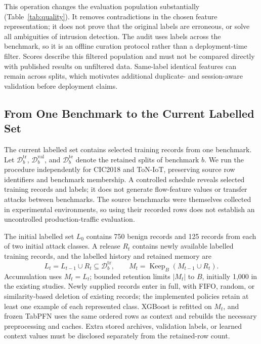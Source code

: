 \documentclass[sigconf,anonymous,pbalance]{acmart}
\begin{document}
This operation changes the evaluation population substantially (Table~\ref{tab:quality}). It removes contradictions in the chosen feature representation; it does not prove that the original labels are erroneous, or solve all ambiguities of intrusion detection. The audit uses labels across the benchmark, so it is an offline curation protocol rather than a deployment-time filter. Scores describe this filtered population and must not be compared directly with published results on unfiltered data. Same-label identical features can remain across splits, which motivates additional duplicate- and session-aware validation before deployment claims.

\subsection{From One Benchmark to the Current Labelled Set}
\label{sec:construction}
The current labelled set contains selected training records from one benchmark. Let $\mathcal D_b^{\mathrm{tr}}$, $\mathcal D_b^{\mathrm{val}}$, and $\mathcal D_b^{\mathrm{te}}$ denote the retained splits of benchmark $b$. We run the procedure independently for CIC2018 and ToN-IoT, preserving source row identifiers and benchmark membership. A controlled schedule reveals selected training records and labels; it does not generate flow-feature values or transfer attacks between benchmarks. The source benchmarks were themselves collected in experimental environments, so using their recorded rows does not establish an uncontrolled production-traffic evaluation.

The initial labelled set $L_0$ contains 750 benign records and 125 records from each of two initial attack classes. A release $R_t$ contains newly available labelled training records, and the labelled history and retained memory are
\begin{equation}
 L_t=L_{t-1}\cup R_t\subseteq\mathcal D_b^{\mathrm{tr}},\qquad
 M_t=\operatorname{Keep}_{B}(M_{t-1}\cup R_t).
\end{equation}
Accumulation uses $M_t=L_t$; bounded retention limits $|M_t|$ to $B$, initially 1,000 in the existing studies. Newly supplied records enter in full, with FIFO, random, or similarity-based deletion of existing records; the implemented policies retain at least one example of each represented class. XGBoost is refitted on $M_t$, and frozen TabPFN uses the same ordered rows as context and rebuilds the necessary preprocessing and caches. Extra stored archives, validation labels, or learned context values must be disclosed separately from the retained-row count.
\end{document}
